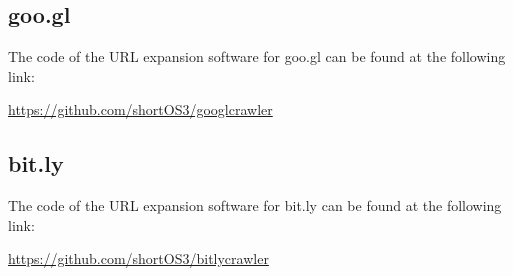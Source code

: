\documentclass[12pt]{article}
\begin{document}
\begin{appendices}
\subsection{goo.gl}

The code of the URL expansion software for goo.gl can be found at the following link:

\url{https://github.com/shortOS3/googlcrawler}

\subsection{bit.ly}

The code of the URL expansion software for bit.ly can be found at the following link:

\url{https://github.com/shortOS3/bitlycrawler}

\end{appendices}
\end{document}
